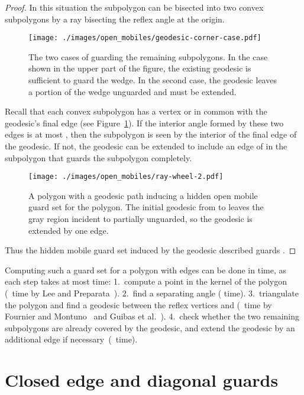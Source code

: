 \documentclass{cccg12}
\begin{document}
\begin{proof}
In this situation the subpolygon can be bisected into two convex subpolygons by a ray bisecting the reflex angle at the origin.

\begin{figure}[ht]
\centering
\texttt{[image: ./images/open\_mobiles/geodesic-corner-case.pdf]}
\caption{The two cases of guarding the remaining subpolygons.
In the case shown in the upper part of the figure, the existing geodesic is sufficient to guard the wedge.
In the second case, the geodesic leaves a portion of the wedge unguarded and must be extended.}
\label{fig:geodesic-corner-case}
\end{figure}

Recall that each convex subpolygon has a vertex  or  in common with the geodesic's final edge (see Figure~\ref{fig:geodesic-corner-case}).
If the interior angle formed by these two edges is at most , then the subpolygon is seen by the interior of the final edge of the geodesic.
If not, the geodesic can be extended to include an edge of  in the subpolygon that guards the subpolygon completely.

\begin{figure}[ht]
\centering
\texttt{[image: ./images/open\_mobiles/ray-wheel-2.pdf]}
\caption{A polygon with a geodesic path inducing a hidden open mobile guard set for the polygon.
The initial geodesic from  to  leaves the gray region incident to  partially unguarded, so the geodesic is extended by one edge.}
\label{fig:ray-wheel-2}
\end{figure}

Thus the hidden mobile guard set induced by the geodesic described guards .
\end{proof}

Computing such a guard set for a polygon with  edges can be done in  time, as each step takes at most  time:
1.~compute a point in the kernel of the polygon (~time by Lee and Preparata~\cite{Lee-1979}).
2.~find a separating angle  ( time).
3.~triangulate the polygon and find a geodesic between the reflex vertices  and  (~time by Fournier and Montuno~\cite{Fournier-1984} and Guibas et al.~\cite{Guibas-1987}).
4.~check whether the two remaining subpolygons are already covered by the geodesic, and extend the geodesic by an additional edge if necessary~(~time).

\section{Closed edge and diagonal guards}
\end{document}
